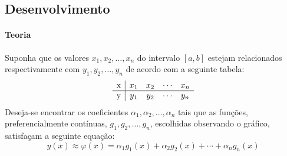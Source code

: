 \documentclass{article}
\begin{document}
        \subsection{Desenvolvimento}
            \paragraph{Teoria}Suponha que os valores $x_{1}, x_{2}, \dots, x_{n}$ do intervalo $[a,b]$ estejam relacionados respectivamente com $y_{1}, y_{2}, \dots, y_{n}$ de acordo com a seguinte tabela:
                \[
                    \begin{array}{c | c c c c}
                        \text{x} & x_{1} & x_{2} & \cdots & x_{n}\\\hline
                        \text{y} & y_{1} & y_{2} & \cdots & y_{n}\\
                    \end{array}
                \]
            Deseja-se encontrar os coeficientes $\alpha_{1}, \alpha_{2}, \dots, \alpha_{n}$ tais que as funções, preferencialmente contínuas, $g_{1}, g_{2}, \dots, g_{n}$, escolhidas observando o gráfico, satisfaçam a seguinte equação:
                \[\boxed{y(x) \approx \varphi(x) = \alpha_{1} g_{1}(x) + \alpha_{2} g_{2}(x) + \cdots + \alpha_{n} g_{n}(x)}\]
\end{document}
